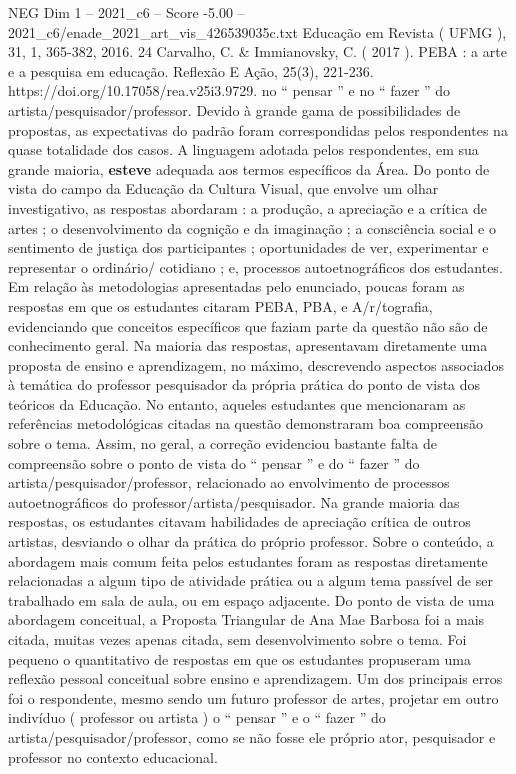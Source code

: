 \begin{textsample}{NEG Dim 1 – 2021\_c6 – Score -5.00 – 2021\_c6/enade\_2021\_art\_vis\_426539035c.txt}
Educação em Revista ( UFMG ), 31, 1, 365-382, 2016. 24 Carvalho, C. \& Immianovsky, C. ( 2017 ).
PEBA : a arte e a pesquisa em educação.
Reflexão E Ação, 25(3), 221-236. https://doi.org/10.17058/rea.v25i3.9729. no “ pensar ” e no “ fazer ” do artista/pesquisador/professor.
Devido à grande gama de possibilidades de propostas, as expectativas do padrão foram correspondidas pelos respondentes na quase totalidade dos casos.
A linguagem adotada pelos respondentes, em sua grande maioria, \textbf{esteve} adequada aos termos específicos da Área.
Do ponto de vista do campo da Educação da Cultura Visual, que envolve um olhar investigativo, as respostas abordaram : a produção, a apreciação e a crítica de artes ; o desenvolvimento da cognição e da imaginação ; a consciência social e o sentimento de justiça dos participantes ; oportunidades de ver, experimentar e representar o ordinário/ cotidiano ; e, processos autoetnográficos dos estudantes.
Em relação às metodologias apresentadas pelo enunciado, poucas foram as respostas em que os estudantes citaram PEBA, PBA, e A/r/tografia, evidenciando que conceitos específicos que faziam parte da questão não são de conhecimento geral.
Na maioria das respostas, apresentavam diretamente uma proposta de ensino e aprendizagem, no máximo, descrevendo aspectos associados à temática do professor pesquisador da própria prática do ponto de vista dos teóricos da Educação.
No entanto, aqueles estudantes que mencionaram as referências metodológicas citadas na questão demonstraram boa compreensão sobre o tema.
Assim, no geral, a correção evidenciou bastante falta de compreensão sobre o ponto de vista do “ pensar ” e do “ fazer ” do artista/pesquisador/professor, relacionado ao envolvimento de processos autoetnográficos do professor/artista/pesquisador.
Na grande maioria das respostas, os estudantes citavam habilidades de apreciação crítica de outros artistas, desviando o olhar da prática do próprio professor.
Sobre o conteúdo, a abordagem mais comum feita pelos estudantes foram as respostas diretamente relacionadas a algum tipo de atividade prática ou a algum tema passível de ser trabalhado em sala de aula, ou em espaço adjacente.
Do ponto de vista de uma abordagem conceitual, a Proposta Triangular de Ana Mae Barbosa foi a mais citada, muitas vezes apenas citada, sem desenvolvimento sobre o tema.
Foi pequeno o quantitativo de respostas em que os estudantes propuseram uma reflexão pessoal conceitual sobre ensino e aprendizagem.
Um dos principais erros foi o respondente, mesmo sendo um futuro professor de artes, projetar em outro indivíduo ( professor ou artista ) o “ pensar ” e o “ fazer ” do artista/pesquisador/professor, como se não fosse ele próprio ator, pesquisador e professor no contexto educacional.

\end{textsample}
